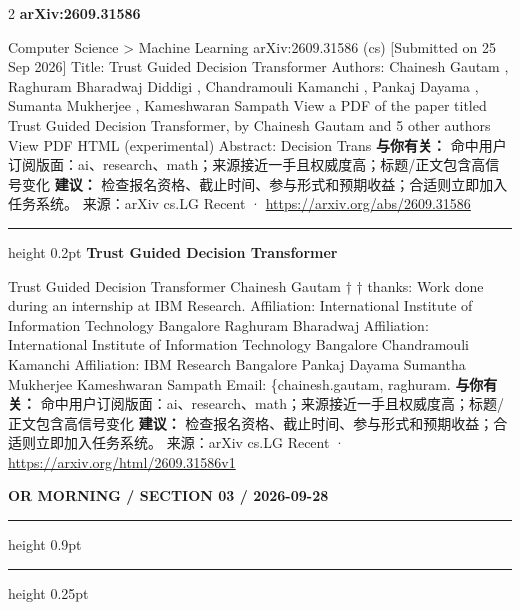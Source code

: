 \documentclass[10.5pt]{ctexart}
\begin{document}
\begin{multicols}{2}
{\large\bfseries arXiv:2609.31586}\par
Computer Science > Machine Learning arXiv:2609.31586 (cs) [Submitted on 25 Sep 2026] Title: Trust Guided Decision Transformer Authors: Chainesh Gautam , Raghuram Bharadwaj Diddigi , Chandramouli Kamanchi , Pankaj Dayama , Sumanta Mukherjee , Kameshwaran Sampath View a PDF of the paper titled Trust Guided Decision Transformer, by Chainesh Gautam and 5 other authors View PDF HTML (experimental) Abstract: Decision Trans
\textbf{与你有关：} 命中用户订阅版面：ai、research、math；来源接近一手且权威度高；标题/正文包含高信号变化
\textbf{建议：} 检查报名资格、截止时间、参与形式和预期收益；合适则立即加入任务系统。
{\footnotesize\color{ormuted} 来源：arXiv cs.LG Recent · \url{https://arxiv.org/abs/2609.31586}}
\vspace{2mm}
\hrule height 0.2pt
\vspace{2mm}
{\large\bfseries Trust Guided Decision Transformer}\par
Trust Guided Decision Transformer Chainesh Gautam † † thanks: Work done during an internship at IBM Research. Affiliation: International Institute of Information Technology Bangalore Raghuram Bharadwaj Affiliation: International Institute of Information Technology Bangalore Chandramouli Kamanchi Affiliation: IBM Research Bangalore Pankaj Dayama Sumantha Mukherjee Kameshwaran Sampath Email: \{chainesh.gautam, raghuram.
\textbf{与你有关：} 命中用户订阅版面：ai、research、math；来源接近一手且权威度高；标题/正文包含高信号变化
\textbf{建议：} 检查报名资格、截止时间、参与形式和预期收益；合适则立即加入任务系统。
{\footnotesize\color{ormuted} 来源：arXiv cs.LG Recent · \url{https://arxiv.org/html/2609.31586v1}}
\end{multicols}
\newpage
{\small\bfseries OR MORNING / SECTION 03 / 2026-09-28}
\vspace{2mm}
\hrule height 0.9pt
\vspace{1.5mm}
\hrule height 0.25pt
\vspace{4mm}
\end{document}
